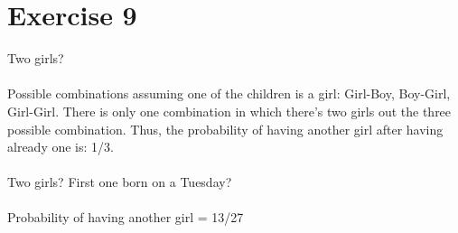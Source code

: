 \documentclass{article}
\begin{document}
\section{Exercise 9}

Two girls? \\
\\
Possible combinations assuming one of the children is a girl: Girl-Boy, Boy-Girl, Girl-Girl. There is only one combination in which there's two girls out the three possible combination. Thus, the probability of having another girl after having already one is: 1/3. \\
\\
Two girls? First one born on a Tuesday? \\
\\
Probability of having another girl = 13/27
 
\end{document}
